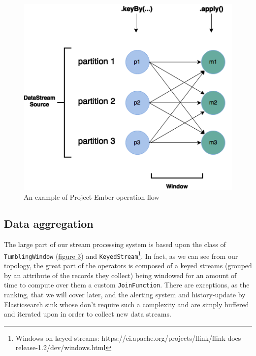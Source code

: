 \begin{figure}[!b]
\begin{center}
	\includegraphics[scale=0.40]{img/ember_keyedstream}
	\caption{An example of Project Ember operation flow}
	\label{fig:ember_operation_flow}
\end{center}
\end{figure}

\subsection{Data aggregation}
The large part of our stream processing system is based upon the class of \texttt{TumblingWindow} (\hyperref[fig:flink_windows]{figure 3}) and \texttt{KeyedStream}\footnote{Windows on keyed streams: https://ci.apache.org/projects/flink/flink-docs-release-1.2/dev/windows.html}. In fact, as we can see from our topology, the great part of the operators is composed of a keyed streams (grouped by an attribute of the records they collect) being windowed for an amount of time to compute over them a custom \texttt{JoinFunction}. There are exceptions, as the ranking, that we will cover later, and the alerting system and history-update by Elasticsearch sink whose don't require such a complexity and are simply buffered and iterated upon in order to collect new data streams. 

